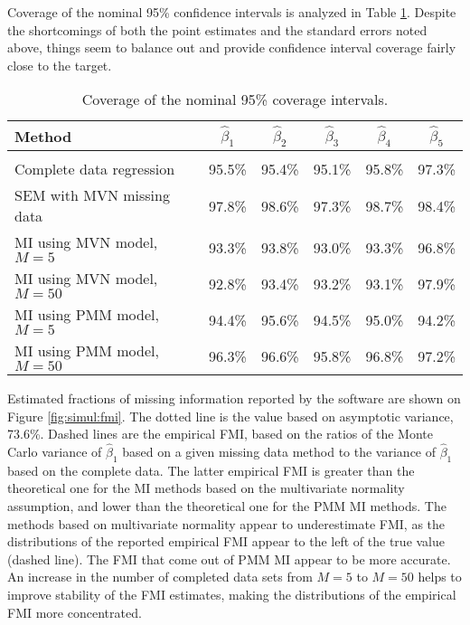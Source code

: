 \documentclass[11pt]{asaproc}
\begin{document}
Coverage of the nominal 95\% confidence intervals is analyzed in Table \ref{tab:simul:cover95}. Despite the shortcomings
of both the point estimates and the standard errors noted above, things seem to balance out and provide confidence interval coverage
fairly close to the target.

\begin{table}[!th]
  \centering
  \caption{Coverage of the nominal 95\% coverage intervals.}\label{tab:simul:cover95}

  \begin{tabular}{l|ccccc}
     Method & $\hat\beta_1$ & $\hat\beta_2$ & $\hat\beta_3$ & $\hat\beta_4$ & $\hat\beta_5$ \\
     \hline \\
     Complete data regression	 & 95.5\% & 95.4\% & 95.1\% & 95.8\% & 97.3\% \\
     SEM with MVN missing data	& 97.8\% & 98.6\% & 97.3\% & 98.7\% & 98.4\% \\
     MI using MVN model, $M=5$	 &93.3\% & 93.8\% & 93.0\% & 93.3\% & 96.8\% \\
     MI using MVN model, $M=50$	&92.8\% & 93.4\% & 93.2\% & 93.1\% & 97.9\% \\
     MI using PMM model, $M=5$	 &94.4\% & 95.6\% & 94.5\% & 95.0\% & 94.2\% \\
     MI using PMM model, $M=50$	&96.3\% & 96.6\% & 95.8\% & 96.8\% & 97.2\% \\
  \end{tabular}
\end{table}

Estimated fractions of missing information reported by the software are shown on Figure \ref{fig:simul:fmi}.
The dotted line is the value based on asymptotic variance, 73.6\%. Dashed lines are the empirical FMI,
based on the ratios of the Monte Carlo variance of $\hat\beta_1$ based on a given missing data method
to the variance of $\hat\beta_1$ based on the complete data. The latter empirical FMI is greater than
the theoretical one for the MI methods based on the multivariate normality assumption, and lower than
the theoretical one for the PMM MI methods. The methods based on multivariate normality appear to underestimate
FMI, as the distributions of the reported empirical FMI appear to the left of the true value (dashed line).
The FMI that come out of PMM MI appear to be more accurate. An increase in the number of completed data sets
from $M=5$ to $M=50$ helps to improve stability of the FMI estimates, making the distributions of the empirical FMI
more concentrated.
\end{document}
